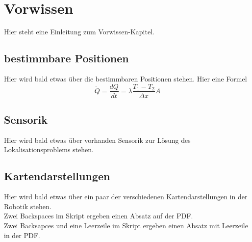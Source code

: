 \clearpage
\chapter{\textbf{Vorwissen}}\label{chap:Vorwissen}

Hier steht eine Einleitung zum Vorwissen-Kapitel.


\section{bestimmbare Positionen}\label{chap:bestimmbare Positionen}

Hier wird bald etwas über die bestimmbaren Positionen stehen.
Hier eine Formel
\begin{equation}\label{eq:waermestrom}
\dot Q = \frac{dQ}{dt} = \lambda \frac{T_1-T_2}{\Delta x} A
\end{equation}


\section{Sensorik}\label{chap:Sensorik}


Hier wird bald etwas über vorhanden Sensorik zur Lösung des Lokalisationsproblems stehen.
\newpage

\section{Kartendarstellungen}\label{chap:Kartendarstellungen}

Hier wird bald etwas über ein paar der verschiedenen Kartendarstellungen in der Robotik stehen.\\ 
Zwei Backspaces im Skript ergeben einen Absatz auf der PDF.\\

Zwei Backsapces und eine Leerzeile im Skript ergeben einen Absatz mit Leerzeile in der PDF.
